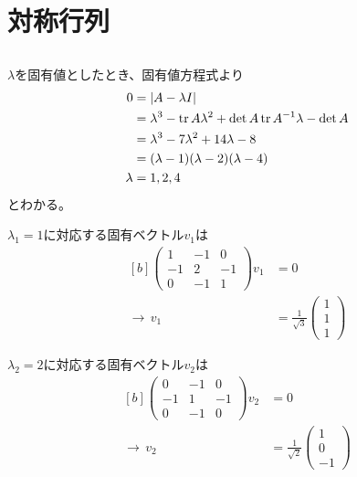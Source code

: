 \documentclass[../ap_2013.tex]{subfiles}
\begin{document}
\setcounter{chapter}{1}
\chapter{対称行列}
\section{}
\(\lambda\)を固有値としたとき、固有値方程式より
\begin{equation}\begin{aligned}[b]
    0 &= \abs{A-\lambda I}\\
    &= \lambda^3 -\tr A \lambda^2 + \det A\tr A^{-1} \lambda - \det A\\
    &= \lambda^3 -7 \lambda^2 + 14 \lambda - 8\\
    &= (\lambda-1)(\lambda-2)(\lambda-4)\\
    \lambda &= 1,2,4
\end{aligned}\end{equation}
とわかる。

\(\lambda_1=1\)に対応する固有ベクトル\(v_1\)は
\begin{equation}\begin{aligned}[b]
    \begin{pmatrix}
        1 & -1 & 0\\
        -1 & 2 & -1\\
        0 & -1 & 1
    \end{pmatrix}v_1&=0\\
    \rightarrow\, v_1 &=\frac{1}{\sqrt{3}} \begin{pmatrix}
        1\\1\\1
    \end{pmatrix}
\end{aligned}\end{equation}

\(\lambda_2=2\)に対応する固有ベクトル\(v_2\)は
\begin{equation}\begin{aligned}[b]
    \begin{pmatrix}
        0 & -1 & 0\\
        -1 & 1 & -1\\
        0 & -1 & 0
    \end{pmatrix}v_2&=0\\
    \rightarrow\, v_2 &=\frac{1}{\sqrt{2}} \begin{pmatrix}
        1\\0\\-1
    \end{pmatrix}
\end{aligned}\end{equation}
\end{document}
